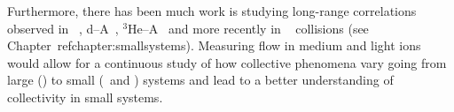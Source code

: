 Furthermore, there has been much work is studying long-range correlations
  observed in \pA~\cite{HION-2016-01,CMS:2012qk,Abelev:2012ola,HION-2012-13,HION-2013-04},
  d--A~\cite{Aidala:2017pup}, $^{3}\mathrm{He}$--A~\cite{Adare:2015ctn} 
  and more recently in \pp~\cite{HION-2015-09,HION-2016-01} collisions 
  (see Chapter~ref{chapter:smallsystems}).
Measuring flow in medium and light ions would allow for a continuous study 
  of how collective phenomena vary going from large (\pbpb) to small 
  (\pA\ and \pp) systems and lead to a better understanding of collectivity
  in small systems.


